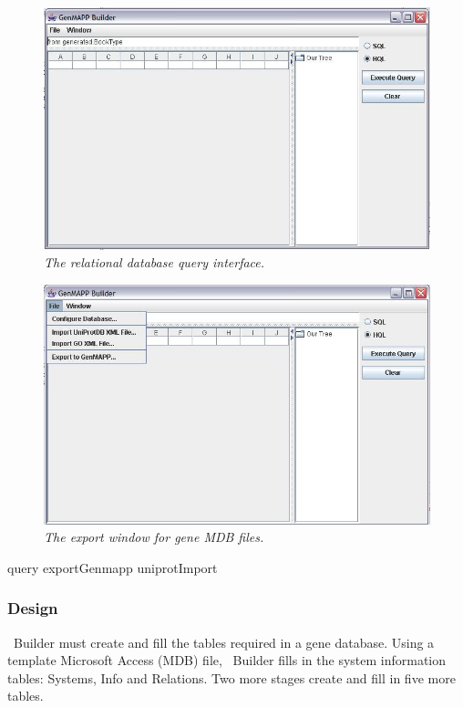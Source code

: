 \begin{figure}[htp]
\centering
\includegraphics[scale=0.75]{Images/query.jpg}
\caption{\small \sl The relational database query interface.}
\end{figure}

\begin{figure}[htp]
\centering
\includegraphics[scale=0.75]{Images/exportGenmapp.jpg}
\caption{\small \sl The export window for \genmapp gene MDB files.}
\end{figure}


query
exportGenmapp
uniprotImport

\subsubsection{Design}
\genmapp~Builder must create and fill the tables required in a \genmapp gene database.  Using a template Microsoft Access (MDB) file, \genmapp~Builder fills in the system information tables: Systems, Info and Relations.  Two more stages create and fill in five more tables.

